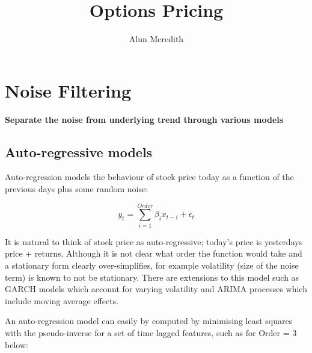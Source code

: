 \documentclass{sig-alternate-05-2015}
\begin{document}
\author{Alun Meredith\vspace{-2ex}%
}
\title{Options Pricing \vspace{-2ex}%
}
\maketitle

\vspace{-30mm}

\begin{abstract}
\end{abstract}

\section{Noise Filtering}
\textbf{Separate the noise from underlying trend through various models}

\subsection{Auto-regressive models}

Auto-regression models the behaviour of stock price today as a function of the previous days plus some random noise:

\begin{equation}
y_{t} = \sum_{i=1}^{Order} \beta_i x_{t-i} + \epsilon_t
\end{equation}

It is natural to think of stock price as auto-regressive; today's price is yesterdays price + returns. Although it is not clear what order the function would take and a stationary form clearly over-simplifies, for example volatility (size of the noise term) is known to not be stationary. There are extensions to this model such as GARCH models which account for varying volatility and ARIMA processes which include moving average effects. 

An auto-regression model can easily by computed by minimising least squares with the pseudo-inverse for a set of time lagged features, such as for Order = 3 below:
\end{document}
